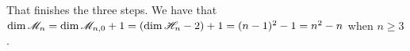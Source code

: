 That finishes the three steps. 
We have that $\dim\mathscr{M}_n=\dim\mathscr{M}_{n,0}+1
 =(\dim\mathscr{H}_n-2)+1=(n-1)^2-1=n^2-n$
when $n\geq 3$.





